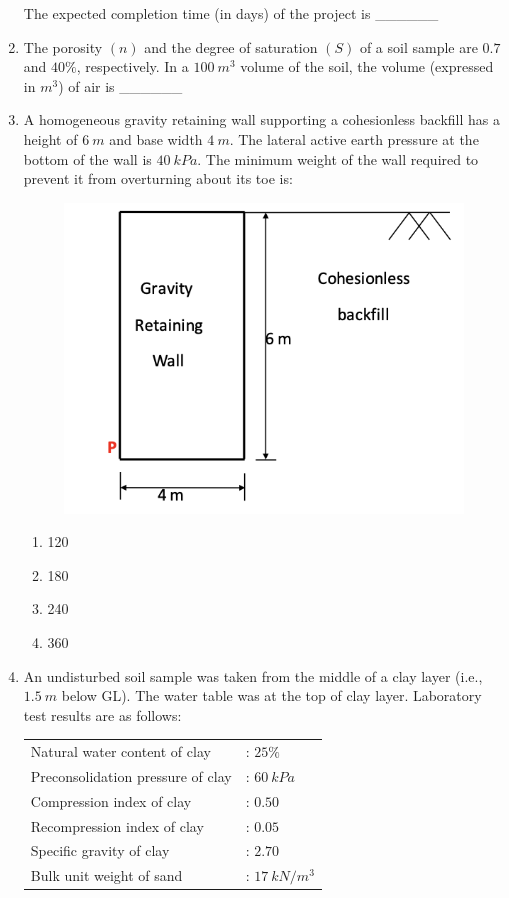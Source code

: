 \documentclass[journal]{IEEEtran}
\begin{document}
\begin{enumerate}[resume]
The expected completion time (in days) of the project is \_\_\_\_\_\_ \hfill {}

\item The porosity $(n)$ and the degree of saturation $(S)$ of a soil sample are $0.7$ and $40\%$, respectively. In a $100 \ m^3$ volume of the soil, the volume (expressed in $m^3$) of air is \_\_\_\_\_\_ \hfill {}

\item A homogeneous gravity retaining wall supporting a cohesionless backfill has a height of $6 \ m$ and base width $4 \ m$. The lateral active earth pressure at the bottom of the wall is $40 \ kPa$. The minimum weight of the wall  required to prevent it from overturning about its toe  is:  \hfill {}

\begin{figure}[H]
    \centering
    \includegraphics[width=0.6\columnwidth]{figs/Q51.png} 
    \caption{}
    \label{fig:placeholder}
\end{figure}
\begin{enumerate}
    \item 120
    \item 180
    \item 240
    \item 360
\end{enumerate}

\item An undisturbed soil sample was taken from the middle of a clay layer (i.e., $1.5 \ m$ below GL). The water table was at the top of clay layer. Laboratory test results are as follows:  \hfill {}

\begin{tabular}{ll}
Natural water content of clay & : $25\%$ \\
Preconsolidation pressure of clay & : $60 \ kPa$ \\
Compression index of clay & : $0.50$ \\
Recompression index of clay & : $0.05$ \\
Specific gravity of clay & : $2.70$ \\
Bulk unit weight of sand & : $17 \ kN/m^3$ \\
\end{tabular}


\end{enumerate}
\end{document}

